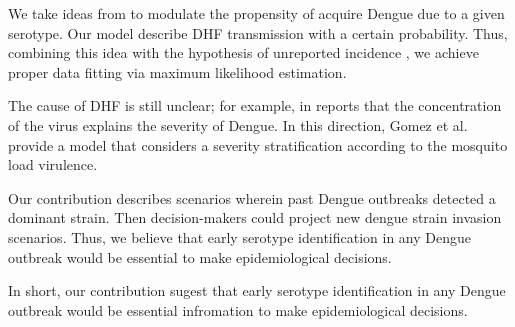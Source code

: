      We take ideas from \citet{Zheng2018, Nuraini2007, Feng1997a} to modulate 
the propensity of acquire Dengue due to a given serotype.  
Our model describe DHF transmission with a certain probability.  
Thus, combining this idea with the hypothesis of unreported 
incidence \cite{Li2013b,Guzman2002}, we achieve proper
data fitting via maximum likelihood estimation. 

    The cause of DHF is still unclear; for example, in \cite{ESTEVA2015} reports
that the concentration of the virus explains the severity of Dengue.
In this direction, Gomez et al. provide a model that considers a
severity stratification according to the mosquito load virulence.

    Our contribution describes scenarios wherein past Dengue
outbreaks detected a dominant  strain. Then decision-makers could
project new dengue strain invasion scenarios. Thus, we believe that early 
serotype identification in any Dengue outbreak would be essential to  
make epidemiological decisions.

    In short, our contribution sugest that early serotype identification in any Dengue
outbreak would be essential infromation to make epidemiological decisions.

